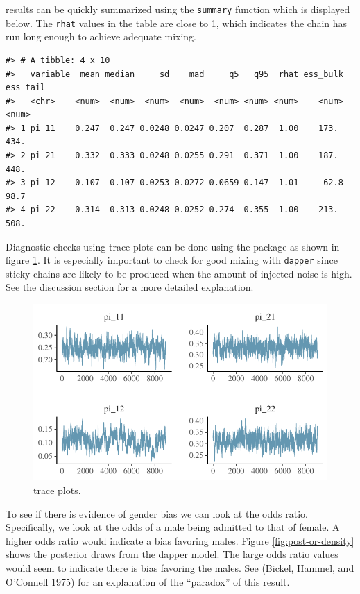results can be quickly summarized using the \texttt{summary} function which is
displayed below. The \texttt{rhat} values in the table are close to 1, which indicates
the chain has run long enough to achieve adequate mixing.

\begin{verbatim}
#> # A tibble: 4 x 10
#>   variable  mean median     sd    mad     q5   q95  rhat ess_bulk ess_tail
#>   <chr>    <num>  <num>  <num>  <num>  <num> <num> <num>    <num>    <num>
#> 1 pi_11    0.247  0.247 0.0248 0.0247 0.207  0.287  1.00    173.     434. 
#> 2 pi_21    0.332  0.333 0.0248 0.0255 0.291  0.371  1.00    187.     448. 
#> 3 pi_12    0.107  0.107 0.0253 0.0272 0.0659 0.147  1.01     62.8     98.7
#> 4 pi_22    0.314  0.313 0.0248 0.0252 0.274  0.355  1.00    213.     508.
\end{verbatim}

Diagnostic checks using trace plots can be done using the  package
as shown in figure \ref{fig:trace-plot}. It is especially important to check for good mixing
with \texttt{dapper} since sticky chains are likely to be produced
when the amount of injected noise is high. See the discussion section
for a more detailed explanation.

\begin{figure}

{\centering \includegraphics{dppaper_files/figure-latex/trace-plot-1} 

}

\caption{trace plots.}\label{fig:trace-plot}
\end{figure}

To see if there is evidence of gender bias we can look at the odds ratio.
Specifically, we look at the odds of a male being admitted to
that of female. A higher odds ratio would indicate a bias
favoring males. Figure \ref{fig:post-or-density} shows the posterior draws
from the dapper model. The large odds ratio values would seem
to indicate there is bias favoring the males. See (Bickel, Hammel, and O'Connell 1975) for
an explanation of the ``paradox'' of this result.

